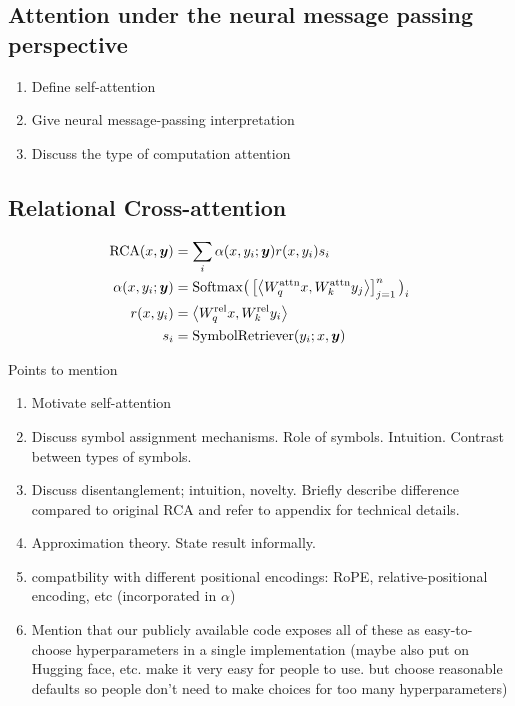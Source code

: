 \documentclass{article}
\begin{document}
\subsection{Attention under the neural message passing perspective}
\begin{enumerate}
  \item Define self-attention
  \item Give neural message-passing interpretation
  \item Discuss the type of computation attention
\end{enumerate}

\subsection{Relational Cross-attention}


\begin{align}
    \RCA(x, \y) &= \sum_{i} \alpha(x, y_i; \y) r(x, y_i) s_i \\
    \alpha(x, y_i; \y) &= \Softmax\bigparen{\bra{\iprod{W_q^{\attn} x}{W_k^{\attn} y_j}}_{j=1}^{n}}_i \\
    r(x, y_i) &= \iprod{W_q^{\rel} x}{W_k^{\rel} y_i}\\
    s_i &= \mathrm{SymbolRetriever}(y_i; x, \y) %
\end{align}

Points to mention
\begin{enumerate}
  \item Motivate self-attention 
  \item Discuss symbol assignment mechanisms. Role of symbols. Intuition. Contrast between types of symbols.
  \item Discuss disentanglement; intuition, novelty. Briefly describe difference compared to original RCA and refer to appendix for technical details.
  \item Approximation theory. State result informally.
  \item compatbility with different positional encodings: RoPE, relative-positional encoding, etc (incorporated in $\alpha$)
  \item Mention that our publicly available code exposes all of these as easy-to-choose hyperparameters in a single implementation (maybe also put on Hugging face, etc. make it very easy for people to use. but choose reasonable defaults so people don't need to make choices for too many hyperparameters)
\end{enumerate}
\end{document}
